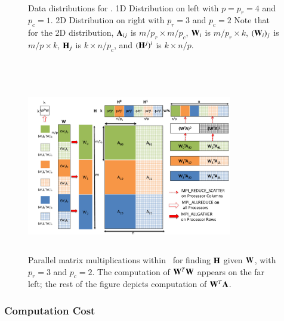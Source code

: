 \begin{figure}[t!]
\centering
\begin{subfigure}[b]{0.3\columnwidth}
\centering
\scalebox{.7}{}
\label{1D}
\end{subfigure} 
~
\begin{subfigure}[b]{0.6\columnwidth}
\centering
\scalebox{.75}{}
\label{2D}
\end{subfigure}
\caption{Data distributions for \ParNMF. 1D Distribution on left with $p=p_r=4$ and $p_c=1$. 2D Distribution on right with $p_r=3$ and $p_c=2$
Note that for the 2D distribution, $\AA_{ij}$ is $m/p_r \times m/p_c$, $\WW_i$ is $m/p_r \times k$, $(\WW_i)_j$ is $m/p\times k$, $\HH_j$ is $k\times n/p_c$, and $(\HH^j)^i$ is $k\times n/p$.}
\label{fig:2D-distribution}
\end{figure}
~
\begin{figure}[t!]
\centering
\includegraphics[width=0.8\textwidth, height=3in]{fig/mm2D.pdf}
\caption{Parallel matrix multiplications within \ParNMF\ for finding $\HH$ given $\WW$, with $p_r=3$ and $p_c=2$.  The computation of $\WW^T\WW$ appears on the far left; the rest of the figure depicts computation of $\WW^T\AA$.}
\label{fig:2D-Algorithm}
\end{figure}


\subsubsection{Computation Cost}

